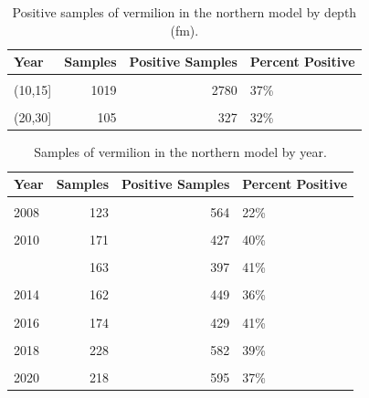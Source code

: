 \documentclass[
  english,
  a4paper,
]{article}
\begin{document}
\begin{table}

\caption{\label{tab:tab-depth-ccfrp}Positive samples of vermilion in the northern model by depth (fm).}
\centering
\begin{tabular}[t]{lrrl}
\toprule
Year & Samples & Positive Samples & Percent Positive\\
\midrule
\cellcolor{gray!6}{(0,10]} & \cellcolor{gray!6}{385} & \cellcolor{gray!6}{1712} & \cellcolor{gray!6}{22\%}\\
(10,15] & 1019 & 2780 & 37\%\\
\cellcolor{gray!6}{(15,20]} & \cellcolor{gray!6}{741} & \cellcolor{gray!6}{1713} & \cellcolor{gray!6}{43\%}\\
(20,30] & 105 & 327 & 32\%\\
\bottomrule
\end{tabular}
\end{table}

\begin{table}

\caption{\label{tab:tab-year-ccfrp}Samples of vermilion in the northern model by year.}
\centering
\begin{tabular}[t]{lrrl}
\toprule
Year & Samples & Positive Samples & Percent Positive\\
\midrule
\cellcolor{gray!6}{2007} & \cellcolor{gray!6}{96} & \cellcolor{gray!6}{552} & \cellcolor{gray!6}{17\%}\\
2008 & 123 & 564 & 22\%\\
\cellcolor{gray!6}{2009} & \cellcolor{gray!6}{115} & \cellcolor{gray!6}{371} & \cellcolor{gray!6}{31\%}\\
2010 & 171 & 427 & 40\%\\
\cellcolor{gray!6}{2011} & \cellcolor{gray!6}{142} & \cellcolor{gray!6}{374} & \cellcolor{gray!6}{38\%}\\
\addlinespace
2012 & 163 & 397 & 41\%\\
\cellcolor{gray!6}{2013} & \cellcolor{gray!6}{110} & \cellcolor{gray!6}{430} & \cellcolor{gray!6}{26\%}\\
2014 & 162 & 449 & 36\%\\
\cellcolor{gray!6}{2015} & \cellcolor{gray!6}{98} & \cellcolor{gray!6}{224} & \cellcolor{gray!6}{44\%}\\
2016 & 174 & 429 & 41\%\\
\addlinespace
\cellcolor{gray!6}{2017} & \cellcolor{gray!6}{190} & \cellcolor{gray!6}{516} & \cellcolor{gray!6}{37\%}\\
2018 & 228 & 582 & 39\%\\
\cellcolor{gray!6}{2019} & \cellcolor{gray!6}{260} & \cellcolor{gray!6}{622} & \cellcolor{gray!6}{42\%}\\
2020 & 218 & 595 & 37\%\\
\bottomrule
\end{tabular}
\end{table}
\end{document}
